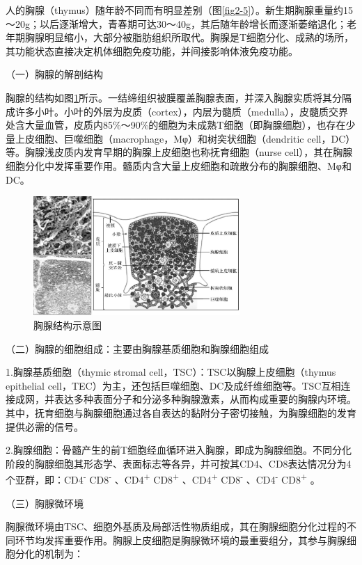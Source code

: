 人的胸腺（thymus）随年龄不同而有明显差别（图\ref{fig2-5}）。新生期胸腺重量约15～20g；以后逐渐增大，青春期可达30～40g，其后随年龄增长而逐渐萎缩退化；老年期胸腺明显缩小，大部分被脂肪组织所取代。胸腺是T细胞分化、成熟的场所，其功能状态直接决定机体细胞免疫功能，并间接影响体液免疫功能。

（一）胸腺的解剖结构

胸腺的结构如图\ref{fig2-6}所示。一结缔组织被膜覆盖胸腺表面，并深入胸腺实质将其分隔成许多小叶。小叶的外层为皮质（cortex），内层为髓质（medulla），皮髓质交界处含大量血管，皮质内85\%～90\%的细胞为未成熟T细胞（即胸腺细胞），也存在少量上皮细胞、巨噬细胞（macrophage，Mφ）和树突状细胞（dendritic
cell，DC）等。胸腺浅皮质内发育早期的胸腺上皮细胞也称抚育细胞（nurse
cell），其在胸腺细胞分化中发挥重要作用。髓质内含大量上皮细胞和疏散分布的胸腺细胞、Mφ和DC。

\begin{figure}[!htbp]
 \centering
 \includegraphics[width=0.7\textwidth]{./images/Image00031.jpg}
 \caption{胸腺结构示意图}
 \label{fig2-6}
  \end{figure} 

（二）胸腺的细胞组成：主要由胸腺基质细胞和胸腺细胞组成

1.胸腺基质细胞（thymic stromal cell，TSC）：TSC以胸腺上皮细胞（thymus
epithelial
cell，TEC）为主，还包括巨噬细胞、DC及成纤维细胞等。TSC互相连接成网，并表达多种表面分子和分泌多种胸腺激素，从而构成重要的胸腺内环境。其中，抚育细胞与胸腺细胞通过各自表达的黏附分子密切接触，为胸腺细胞的发育提供必需的信号。

2.胸腺细胞：骨髓产生的前T细胞经血循环进入胸腺，即成为胸腺细胞。不同分化阶段的胸腺细胞其形态学、表面标志等各异，并可按其CD4、CD8表达情况分为4个亚群，即：CD4\textsuperscript{-}
CD8\textsuperscript{-} 、CD4\textsuperscript{+} CD8\textsuperscript{+}
、CD4\textsuperscript{+} CD8\textsuperscript{-} 、CD4\textsuperscript{-}
CD8\textsuperscript{+} 。

（三）胸腺微环境

胸腺微环境由TSC、细胞外基质及局部活性物质组成，其在胸腺细胞分化过程的不同环节均发挥重要作用。胸腺上皮细胞是胸腺微环境的最重要组分，其参与胸腺细胞分化的机制为：

